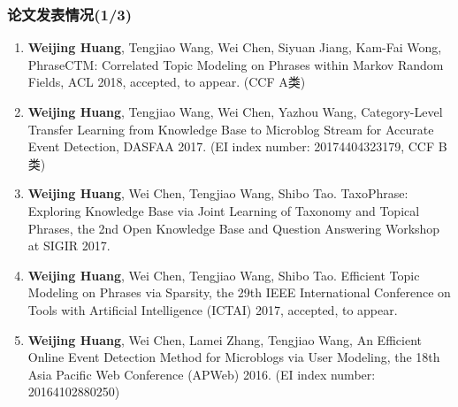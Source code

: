 \begin{transparentFootline}
\begin{frame}
\frametitle{论文发表情况(1/3)}

\footnotesize
\begin{enumerate}
\item \textbf{Weijing Huang}, Tengjiao Wang, Wei Chen, Siyuan Jiang, Kam-Fai Wong, PhraseCTM: Correlated Topic Modeling on Phrases within Markov Random Fields, ACL 2018, accepted, to appear. (CCF A类) 
\item \textbf{Weijing Huang}, Tengjiao Wang, Wei Chen, Yazhou Wang, Category-Level Transfer Learning from Knowledge Base to Microblog Stream for Accurate Event Detection, DASFAA 2017. (EI index number: 20174404323179, CCF B类)
\item \textbf{Weijing Huang}, Wei Chen, Tengjiao Wang, Shibo Tao. TaxoPhrase: Exploring Knowledge Base via Joint Learning of Taxonomy and Topical Phrases, the 2nd Open Knowledge Base and Question Answering Workshop at SIGIR 2017.
\item \textbf{Weijing Huang}, Wei Chen, Tengjiao Wang, Shibo Tao. Efficient Topic Modeling on Phrases via Sparsity, the 29th IEEE International Conference on Tools with Artificial Intelligence (ICTAI) 2017, accepted, to appear. 
\item \textbf{Weijing Huang}, Wei Chen, Lamei Zhang, Tengjiao Wang, An Efficient Online Event Detection Method for Microblogs via User Modeling, the 18th Asia Pacific Web Conference (APWeb) 2016. (EI index number: 20164102880250)
\end{enumerate}
\end{frame}
\end{transparentFootline}

